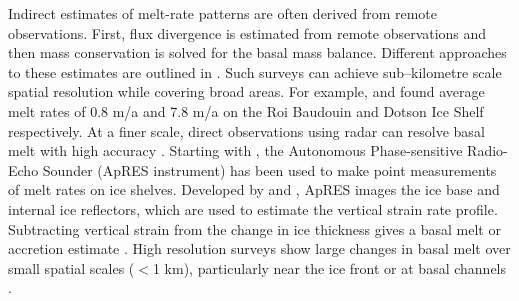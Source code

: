 Indirect estimates of melt-rate patterns are often derived from remote observations. First, flux divergence is estimated from remote observations and then mass conservation is solved for the basal mass balance. Different approaches to these estimates are outlined in \cite{berger2017detecting}. Such surveys can achieve sub--kilometre scale spatial resolution while covering broad areas. For example, \cite {berger2017detecting} and \cite{gourmelen2017channelized} found average melt rates of 0.8 m/a and 7.8 m/a on the Roi Baudouin and Dotson Ice Shelf respectively.
At a finer scale, direct observations using radar can resolve basal melt with high accuracy \cite [e.g.][] {vavnkova2020observations,young2018resolving}. Starting with \cite{corr2002precise}, the Autonomous Phase-sensitive Radio-Echo Sounder (ApRES instrument) has been used to make point measurements of melt rates on ice shelves. Developed by \cite{brennan2014phase} and \cite{nicholls2015ground}, ApRES images the ice base and internal ice reflectors, which are used to estimate the vertical strain rate profile. Subtracting vertical strain from the change in ice thickness gives a basal melt or accretion estimate \citep{brennan2014phase}. 
High resolution surveys show large changes in basal melt over small spatial scales ($<$1 km), particularly near the ice front \cite [e.g.][] {stewart2019basal} or at basal channels \cite [e.g.][] {stanton2013channelized, dutrieux2014basal,marsh2016high}.


